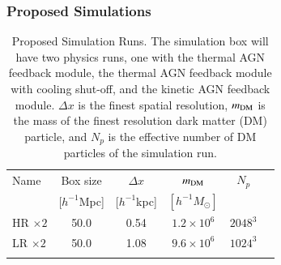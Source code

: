 \documentclass[letterpaper,11pt]{article}
\begin{document}
\subsubsection{Proposed Simulations}

\begin{table}[t]
\centering
\begin{tabular}{l c c c c c }
Name & Box size & $\Delta x$ & $m_{\rm DM}$ & $N_p$  \\
& [$h^{-1}$Mpc] & [$h^{-1}$kpc] & $[h^{-1}M_\odot] $ \\
\hline
\hline
HR $\times 2$& 50.0 & 0.54 & $1.2\times 10^6$ & $2048^3$ \\
LR $\times 2$& 50.0 & 1.08 & $9.6\times 10^6$ & $1024^3$ \\
\hline
\hline
\label{tab:sims}
\end{tabular}
\caption{Proposed Simulation Runs. The simulation box will have two physics runs, one with the thermal AGN feedback module, the thermal AGN feedback module with cooling shut-off, and the kinetic AGN feedback module.  $\Delta x$ is the finest spatial resolution, $m_{\rm DM}$ is the mass of the finest resolution dark matter (DM) particle, and $N_p$ is the effective number of DM particles of the simulation run. }
\end{table}

\end{document}
